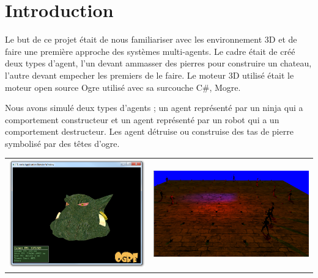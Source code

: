 \chapter{Introduction}
\thispagestyle{fancy} Le but de ce projet était de nous familiariser
avec les environnement 3D et de faire une première approche des
systèmes multi-agents. Le cadre était de créé deux types d'agent, l'un
devant ammasser des pierres pour construire un chateau, l'autre devant
empecher les premiers de le faire. Le moteur 3D utilisé était le
moteur open source Ogre utilisé avec sa surcouche C\#, Mogre.

Nous avons simulé deux types d'agents ; un agent représenté par un ninja qui a comportement constructeur et un agent représenté par un robot qui a un comportement destructeur. Les agent détruise ou construise des tas de pierre symbolisé par des têtes d'ogre.
\\
\begin{center}
\begin{tabular}{c c}
\includegraphics[width=7cm]{Images/mogre_logo.png}
&
\includegraphics[width=8cm]{Images/mogre_capture.png}
\end{tabular}
\end{center}
